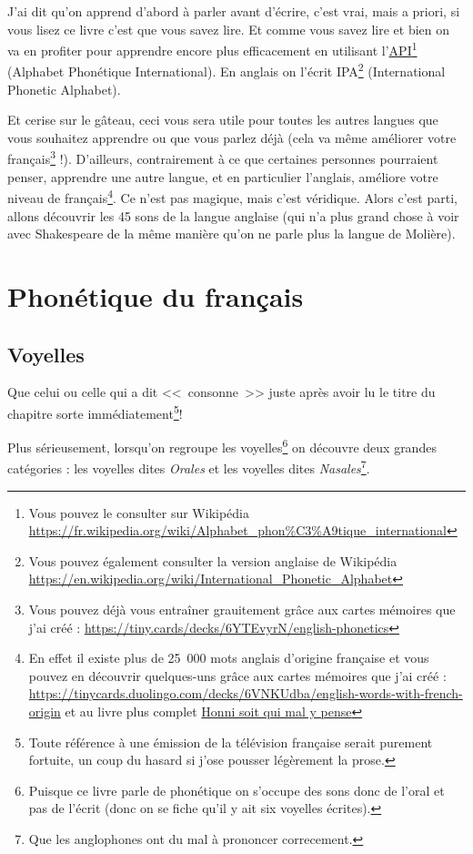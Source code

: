 \documentclass[12pt,a4paper]{book}
\begin{document}
J'ai dit qu'on apprend d'abord à parler avant d'écrire, c'est vrai,
mais a priori, si vous lisez ce livre c'est que vous savez lire. Et
comme vous savez lire et bien on va en profiter pour apprendre encore
plus efficacement en utilisant
l'\href{https://fr.wikipedia.org/wiki/Alphabet\_phon\%25C3\%25A9tique\_international}{API}\footnote{Vous
pouvez le consulter sur Wikipédia \url{https://fr.wikipedia.org/wiki/Alphabet_phon\%C3\%A9tique_international}}
(Alphabet Phonétique International). En anglais on l'écrit
IPA\footnote{Vous pouvez également consulter la version anglaise de
  Wikipédia \url{https://en.wikipedia.org/wiki/International_Phonetic_Alphabet}}
(International Phonetic Alphabet).\par

Et cerise sur le gâteau, ceci
vous sera utile pour toutes les autres langues que vous souhaitez
apprendre ou que vous parlez déjà (cela va même améliorer votre
français\footnote{Vous pouvez déjà vous entraîner grauitement grâce
  aux cartes mémoires que j'ai créé : \url{https://tiny.cards/decks/6YTEvyrN/english-phonetics}} !). D'ailleurs, contrairement à ce que certaines personnes
pourraient penser, apprendre une autre langue, et en particulier
l'anglais, améliore votre niveau de français\footnote{En effet il existe plus de 25~000 mots anglais
  d'origine française et vous pouvez en découvrir quelques-uns grâce
  aux cartes mémoires que j'ai créé :
  \url{https://tinycards.duolingo.com/decks/6VNKUdba/english-words-with-french-origin}
et au livre plus complet \href{https://www.amazon.fr/gp/product/225315444X/ref=as_li_tl?ie=UTF8&camp=1642&creative=6746&creativeASIN=225315444X&linkCode=as2&tag=wwwbecomefree-21&linkId=5317e7b0e063b4d6c7c676b11420e49d}{Honni soit qui mal y pense} }. Ce n'est pas magique,
mais c'est véridique. Alors c'est parti, allons découvrir les 45 sons
de la langue anglaise (qui n'a plus grand chose à voir avec
Shakespeare de la même manière qu'on ne parle plus la langue de
Molière).

\part{Phonétique du français}
\chapter{Voyelles}\label{chap:voy}
Que celui ou celle qui a dit <<~consonne~>> juste après avoir lu le
titre du chapitre sorte immédiatement\footnote{Toute référence à une
  émission de la télévision française serait purement fortuite, un
  coup du hasard si j'ose pousser légèrement la prose.}!\par
Plus sérieusement, lorsqu'on regroupe les voyelles\footnote{Puisque ce
  livre parle de phonétique on s'occupe des sons donc de l'oral et pas
  de l'écrit (donc on se fiche qu'il y ait six voyelles écrites).} on
découvre deux grandes catégories : les voyelles dites \emph{Orales} et
les voyelles dites \emph{Nasales}\footnote{Que les anglophones ont du
  mal à prononcer correcement.}.
\end{document}
